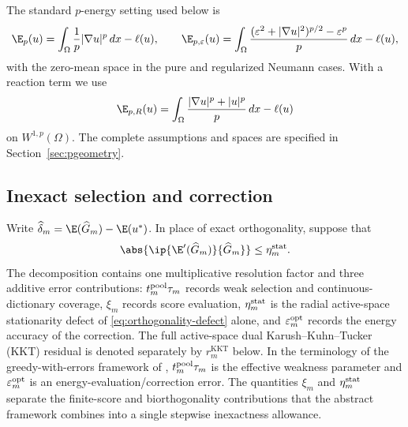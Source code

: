 The standard $p$-energy setting used below is
\[
 \E_p(u)=\int_\Omega \frac1p|\nabla u|^p\,dx-\ell(u),\qquad
 \E_{p,\varepsilon}(u)=\int_\Omega
 \frac{(\varepsilon^2+|\nabla u|^2)^{p/2}-\varepsilon^p}{p}\,dx-\ell(u),
\]
with the zero-mean space in the pure and regularized Neumann cases. With a reaction
term we use
\[
 \E_{p,R}(u)=\int_\Omega\frac{|\nabla u|^p+|u|^p}{p}\,dx-\ell(u)
\]
on $W^{1,p}(\Omega)$. The complete assumptions and spaces are specified in
Section~\ref{sec:pgeometry}.

\subsection{Inexact selection and correction}

Write \(\widehat\delta_m=\E(\widehat G_m)-\E(u^*)\). In place of exact orthogonality, suppose that
\begin{equation}
  \abs{\ip{\E'(\widehat G_m)}{\widehat G_m}}\leq\eta_m^{\rm stat}.
  \label{eq:orthogonality-defect}
\end{equation}
The decomposition contains one multiplicative resolution factor and three additive error
contributions: \(t_m^{\rm pool}\tau_m\) records weak selection and continuous-dictionary coverage,
\(\xi_m\) records score evaluation, \(\eta_m^{\rm stat}\) is the radial active-space stationarity
defect of \cref{eq:orthogonality-defect} alone, and \(\varepsilon_m^{\rm opt}\) records the energy
accuracy of the correction. The full active-space dual Karush--Kuhn--Tucker (KKT) residual is
denoted separately by \(r_m^{\mathrm{KKT}}\) below. In the terminology of the greedy-with-errors
framework of \cite[Section~3]{DereventsovTemlyakov2022}, \(t_m^{\rm pool}\tau_m\) is the effective
weakness parameter and \(\varepsilon_m^{\rm opt}\) is an energy-evaluation/correction error. The
quantities \(\xi_m\) and \(\eta_m^{\rm stat}\) separate the finite-score and biorthogonality
contributions that the abstract framework combines into a single stepwise inexactness allowance.

